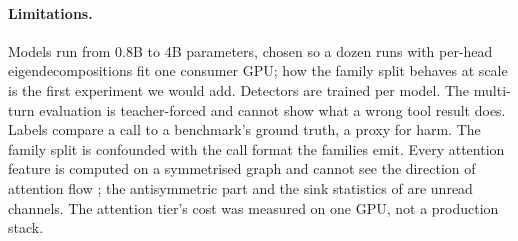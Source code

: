 \paragraph{Limitations.}
Models run from 0.8B to 4B parameters, chosen so a dozen runs with per-head eigendecompositions fit one
consumer GPU; how the family split behaves at scale is the first experiment we would add. Detectors are
trained per model. The multi-turn evaluation is teacher-forced and cannot show what a wrong tool result
does. Labels compare a call to a benchmark's ground truth, a proxy for harm. The family split is confounded
with the call format the families emit. Every attention feature is computed on a symmetrised graph and cannot
see the direction of attention flow \citep{dahlem2026transport}; the antisymmetric part and the sink
statistics of \citet{binkowski2026sinks} are unread channels. The attention tier's cost was measured on one
GPU, not a production stack.
